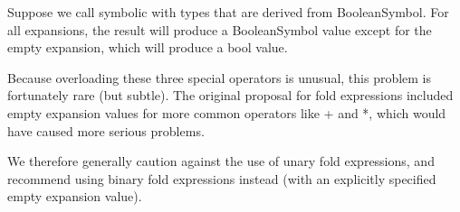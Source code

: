 Suppose we call symbolic with types that are derived from BooleanSymbol. For all expansions, the result will produce a BooleanSymbol value except for the empty expansion, which will produce a bool value.

\begin{tcolorbox}[colback=webgreen!5!white,colframe=webgreen!75!black]
\hspace*{0.75cm}Because overloading these three special operators is unusual, this problem is fortunately rare (but subtle). The original proposal for fold expressions included empty expansion values for more common operators like + and *, which would have caused more serious problems.
\end{tcolorbox}

We therefore generally caution against the use of unary fold expressions, and recommend using binary fold expressions instead (with an explicitly specified empty expansion value).






